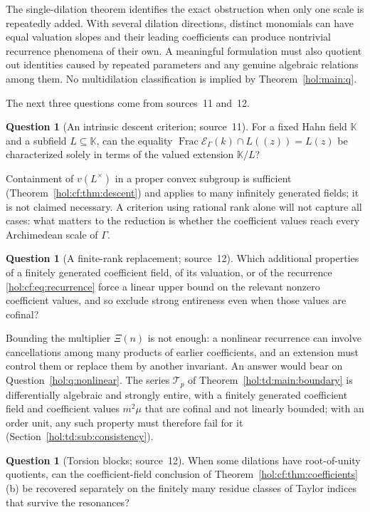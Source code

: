 \documentclass[11pt]{article}
\numberwithin{equation}{section}
\theoremstyle{definition}
\newtheorem{question}[theorem]{Question}
\theoremstyle{remark}
\newcommand{\KK}{\mathbb K}
\newcommand{\EK}{\mathcal E_\Gamma(k)}
\newcommand{\FE}{\operatorname{Frac}\EK}
\begin{document}
The single-dilation theorem identifies the exact obstruction when only one
scale is repeatedly added. With several dilation directions, distinct
monomials can have equal valuation slopes and their leading coefficients can
produce nontrivial recurrence phenomena of their own. A meaningful formulation
must also quotient out identities caused by repeated parameters and any
genuine algebraic relations among them. No multidilation classification is
implied by Theorem~\ref{hol:main:q}.

The next three questions come from sources~11 and~12.

\begin{question}[An intrinsic descent criterion; source~11]
\label{hol:cf:q:descent}
For a fixed Hahn field $\KK$ and a subfield $L\subseteq\KK$, can the equality
$\FE\cap L((z))=L(z)$ be characterized solely in terms of the valued
extension $\KK/L$?
\end{question}

Containment of $v(L^\times)$ in a proper convex subgroup is sufficient
(Theorem~\ref{hol:cf:thm:descent}) and applies to many infinitely generated
fields; it is not claimed necessary. A criterion using rational rank alone
will not capture all cases: what matters to the reduction is whether the
coefficient values reach every Archimedean scale of $\Gamma$.

\begin{question}[A finite-rank replacement; source~12]
\label{hol:cf:q:finiterank}
Which additional properties of a finitely generated coefficient field, of its
valuation, or of the recurrence \eqref{hol:cf:eq:recurrence} force a linear
upper bound on the relevant nonzero coefficient values, and so exclude strong
entireness even when those values are cofinal?
\end{question}

Bounding the multiplier $\Xi(n)$ is not enough: a nonlinear recurrence can
involve cancellations among many products of earlier coefficients, and an
extension must control them or replace them by another invariant. An answer
would bear on Question~\ref{hol:q:nonlinear}. The series $\mathcal T_p$ of
Theorem~\ref{hol:td:main:boundary} is differentially algebraic and strongly
entire, with a finitely generated coefficient field and coefficient values
$m^2\mu$ that are cofinal and not linearly bounded; with an order unit, any
such property must therefore fail for it (Section~\ref{hol:td:sub:consistency}).

\begin{question}[Torsion blocks; source~12]\label{hol:cf:q:torsion}
When some dilations have root-of-unity quotients, can the coefficient-field
conclusion of Theorem~\ref{hol:cf:thm:coefficients}\,(b) be recovered
separately on the finitely many residue classes of Taylor indices that
survive the resonances?
\end{question}
\end{document}
